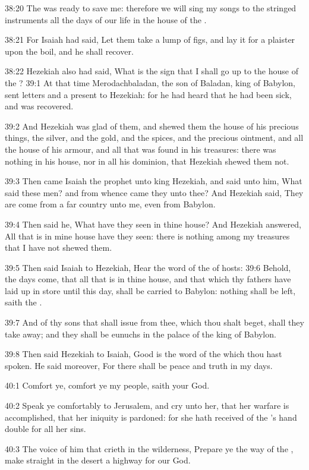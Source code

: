 38:20 The \LORD was ready to save me: therefore we will sing my songs to the stringed instruments all the days of our life in the house of the \LORD.

38:21 For Isaiah had said, Let them take a lump of figs, and lay it for a plaister upon the boil, and he shall recover.

38:22 Hezekiah also had said, What is the sign that I shall go up to the house of the \LORD?  39:1 At that time Merodachbaladan, the son of Baladan, king of Babylon, sent letters and a present to Hezekiah: for he had heard that he had been sick, and was recovered.

39:2 And Hezekiah was glad of them, and shewed them the house of his precious things, the silver, and the gold, and the spices, and the precious ointment, and all the house of his armour, and all that was found in his treasures: there was nothing in his house, nor in all his dominion, that Hezekiah shewed them not.

39:3 Then came Isaiah the prophet unto king Hezekiah, and said unto him, What said these men? and from whence came they unto thee? And Hezekiah said, They are come from a far country unto me, even from Babylon.

39:4 Then said he, What have they seen in thine house? And Hezekiah answered, All that is in mine house have they seen: there is nothing among my treasures that I have not shewed them.

39:5 Then said Isaiah to Hezekiah, Hear the word of the \LORD of hosts: 39:6 Behold, the days come, that all that is in thine house, and that which thy fathers have laid up in store until this day, shall be carried to Babylon: nothing shall be left, saith the \LORD.

39:7 And of thy sons that shall issue from thee, which thou shalt beget, shall they take away; and they shall be eunuchs in the palace of the king of Babylon.

39:8 Then said Hezekiah to Isaiah, Good is the word of the \LORD which thou hast spoken. He said moreover, For there shall be peace and truth in my days.

40:1 Comfort ye, comfort ye my people, saith your God.

40:2 Speak ye comfortably to Jerusalem, and cry unto her, that her warfare is accomplished, that her iniquity is pardoned: for she hath received of the \LORD's hand double for all her sins.

40:3 The voice of him that crieth in the wilderness, Prepare ye the way of the \LORD, make straight in the desert a highway for our God.

